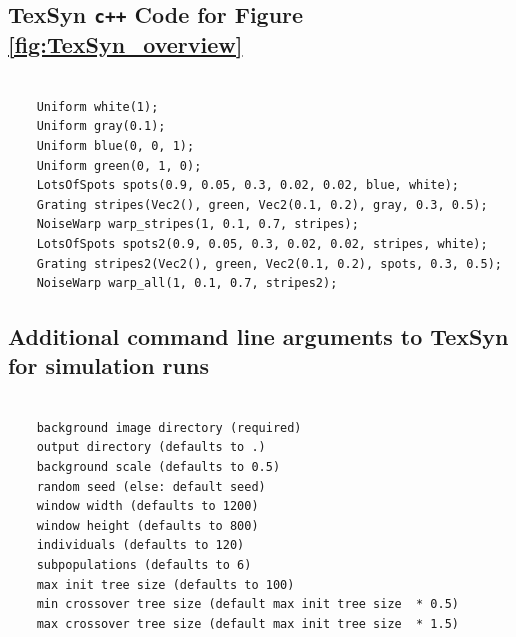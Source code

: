 \documentclass[letterpaper]{article}
\newcommand{\texsyn}[0]{TexSyn}
\begin{document}

\vspace{0.5cm}

\subsection{\texsyn{} \texttt{c++} Code for Figure \ref{fig:TexSyn_overview}}
\label{sec:cpp_code}
\begin{minipage}{\linewidth}
\begin{small}
\begin{verbatim}

    Uniform white(1);
    Uniform gray(0.1);
    Uniform blue(0, 0, 1);
    Uniform green(0, 1, 0);
    LotsOfSpots spots(0.9, 0.05, 0.3, 0.02, 0.02, blue, white);
    Grating stripes(Vec2(), green, Vec2(0.1, 0.2), gray, 0.3, 0.5);
    NoiseWarp warp_stripes(1, 0.1, 0.7, stripes);
    LotsOfSpots spots2(0.9, 0.05, 0.3, 0.02, 0.02, stripes, white);
    Grating stripes2(Vec2(), green, Vec2(0.1, 0.2), spots, 0.3, 0.5);
    NoiseWarp warp_all(1, 0.1, 0.7, stripes2);

\end{verbatim}
\end{small}
\end{minipage}


\vspace{0.5cm}
\subsection{Additional command line arguments to \texsyn{} for simulation runs}
\label{sec:texsyn_cmd_line_args}
\begin{minipage}{\linewidth}
\begin{small}
\begin{verbatim}

    background image directory (required)
    output directory (defaults to .)
    background scale (defaults to 0.5)
    random seed (else: default seed)
    window width (defaults to 1200)
    window height (defaults to 800)
    individuals (defaults to 120)
    subpopulations (defaults to 6)
    max init tree size (defaults to 100)
    min crossover tree size (default max init tree size  * 0.5)
    max crossover tree size (default max init tree size  * 1.5)
\end{verbatim}
\end{small}
\end{minipage}
\end{document}

